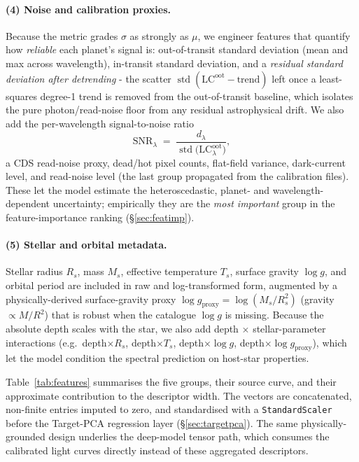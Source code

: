 \documentclass[12pt]{article}
\begin{document}
\paragraph{(4) Noise and calibration proxies.} Because the metric grades $\sigma$ as strongly as $\mu$, we engineer features that quantify how \emph{reliable} each planet's signal is: out-of-transit standard deviation (mean and max across wavelength), in-transit standard deviation, and a \emph{residual standard deviation after detrending} - the scatter $\operatorname{std}(\mathrm{LC}^{\text{oot}} - \widehat{\text{trend}})$ left once a least-squares degree-1 trend is removed from the out-of-transit baseline, which isolates the pure photon/read-noise floor from any residual astrophysical drift. We also add the per-wavelength signal-to-noise ratio
\[
\mathrm{SNR}_\lambda \;=\; \frac{d_\lambda}{\operatorname{std}\!\big(\mathrm{LC}^{\text{oot}}_\lambda\big)},
\]
a CDS read-noise proxy, dead/hot pixel counts, flat-field variance, dark-current level, and read-noise level (the last group propagated from the calibration files). These let the model estimate the heteroscedastic, planet- and wavelength-dependent uncertainty; empirically they are the \emph{most important} group in the feature-importance ranking (\S\ref{sec:featimp}).

\paragraph{(5) Stellar and orbital metadata.} Stellar radius $R_s$, mass $M_s$, effective temperature $T_s$, surface gravity $\log g$, and orbital period are included in raw and log-transformed form, augmented by a physically-derived surface-gravity proxy $\log g_{\text{proxy}} = \log(M_s/R_s^2)$ (gravity $\propto M/R^2$) that is robust when the catalogue $\log g$ is missing. Because the absolute depth scales with the star, we also add depth$\,\times\,$stellar-parameter interactions (e.g.\ depth$\times R_s$, depth$\times T_s$, depth$\times\log g$, depth$\times\log g_{\text{proxy}}$), which let the model condition the spectral prediction on host-star properties.

Table~\ref{tab:features} summarises the five groups, their source curve, and their approximate contribution to the descriptor width. The vectors are concatenated, non-finite entries imputed to zero, and standardised with a \texttt{StandardScaler} before the Target-PCA regression layer (\S\ref{sec:targetpca}). The same physically-grounded design underlies the deep-model tensor path, which consumes the calibrated light curves directly instead of these aggregated descriptors.
\end{document}
